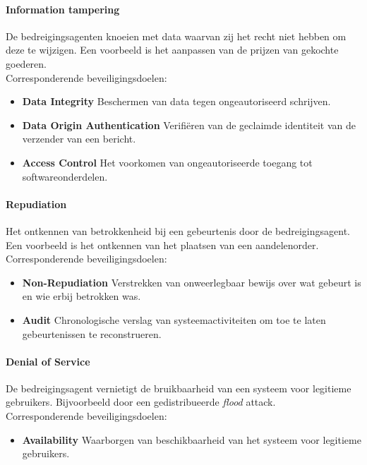 \documentclass[../main.tex]{subfiles}
\begin{document}
\paragraph{Information tampering} 
De bedreigingsagenten knoeien met data waarvan zij het recht niet hebben om deze te wijzigen. Een voorbeeld is het aanpassen van de prijzen van gekochte goederen. 
\\
Corresponderende beveiligingsdoelen:
\begin{itemize}
	\item \textbf{Data Integrity} Beschermen van data tegen ongeautoriseerd schrijven.
	\item \textbf{Data Origin Authentication} Verifi\"eren van de geclaimde identiteit van de verzender van een bericht. 
	\item \textbf{Access Control} Het voorkomen van ongeautoriseerde toegang tot softwareonderdelen.
\end{itemize}

\paragraph{Repudiation} Het ontkennen van betrokkenheid bij een gebeurtenis door de bedreigingsagent. Een voorbeeld is het ontkennen van het plaatsen van een aandelenorder. 
\\
Corresponderende beveiligingsdoelen:
\begin{itemize}
	\item \textbf{Non-Repudiation} Verstrekken van onweerlegbaar bewijs over wat gebeurt is en wie erbij betrokken was.
	\item \textbf{Audit} Chronologische verslag van systeemactiviteiten om toe te laten gebeurtenissen te reconstrueren.
\end{itemize}

\paragraph{Denial of Service}
De bedreigingsagent vernietigt de bruikbaarheid van een systeem voor legitieme gebruikers. Bijvoorbeeld door een gedistribueerde \textit{flood} attack.
\\
Corresponderende beveiligingsdoelen:
\begin{itemize}
	\item \textbf{Availability} Waarborgen van beschikbaarheid van het systeem voor legitieme gebruikers.
\end{itemize}
\end{document}
